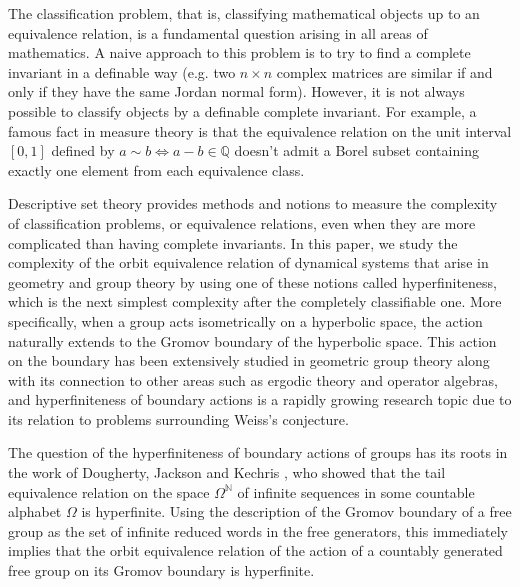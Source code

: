\documentclass{article}[11pt]
\newcommand{\N}{\mathbb{N}}
\begin{document}
The classification problem, that is, classifying mathematical objects up to an equivalence relation, is a fundamental question arising in all areas of mathematics. A naive approach to this problem is to try to find a complete invariant in a definable way (e.g. two $n \times n$ complex matrices are similar if and only if they have the same Jordan normal form). However, it is not always possible to classify objects by a definable complete invariant. For example, a famous fact in measure theory is that the equivalence relation on the unit interval $[0,1]$ defined by $a \sim b \iff a-b \in \mathbb{Q}$ doesn't admit a Borel subset containing exactly one element from each equivalence class.

Descriptive set theory provides methods and notions to measure the complexity of classification problems, or equivalence relations, even when they are more complicated than having complete invariants. In this paper, we study the complexity of the orbit equivalence relation of dynamical systems that arise in geometry and group theory by using one of these notions called hyperfiniteness, which is the next simplest complexity after the completely classifiable one. More specifically, when a group acts isometrically on a hyperbolic space, the action naturally extends to the Gromov boundary of the hyperbolic space. This action on the boundary has been extensively studied in geometric group theory along with its connection to other areas such as ergodic theory and operator algebras, and hyperfiniteness of boundary actions is a rapidly growing research topic due to its relation to problems surrounding Weiss's conjecture.

The question of the hyperfiniteness of boundary actions of groups has its roots in the work of Dougherty, Jackson and Kechris \cite{DJK94}, who showed that the tail equivalence relation on the space $\Omega^{\N}$ of infinite sequences in some countable alphabet $\Omega$ is hyperfinite. Using the description of the Gromov boundary of a free group as the set of infinite reduced words in the free generators, this immediately implies that the orbit equivalence relation of the action of a countably generated free group on its Gromov boundary is hyperfinite. 
\end{document}
